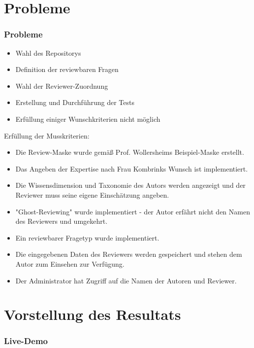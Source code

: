 \documentclass{beamer}
\begin{document}
	\section{Probleme}
		\begin{frame}
			\frametitle{Probleme}
    		\begin{itemize}
    			\item Wahl des Repositorys
		    	\item Definition der reviewbaren Fragen
    			\item Wahl der Reviewer-Zuordnung
    			\item Erstellung und Durchführung der Tests
    			\item Erfüllung einiger Wunschkriterien nicht möglich
    		\end{itemize}
		\end{frame}
		\begin{frame}
			Erfüllung der Musskriterien:
			\begin{itemize}
				\item Die Review-Maske wurde gemäß Prof. Wollersheims Beispiel-Maske erstellt.
				\item Das Angeben der Expertise nach Frau Kombrinks Wunsch ist implementiert.
				\item Die Wissensdimension und Taxonomie des Autors werden angezeigt und der Reviewer muss seine eigene Einschätzung angeben.
				\item "Ghost-Reviewing" wurde implementiert - der Autor erfährt nicht den Namen des Reviewers und umgekehrt.
				\item Ein reviewbarer Fragetyp wurde implementiert.	
				\item Die eingegebenen Daten des Reviewers werden gespeichert und stehen dem Autor zum Einsehen zur Verfügung.
				\item Der Administrator hat Zugriff auf die Namen der Autoren und Reviewer.
			\end{itemize}
		\end{frame}

	\section{Vorstellung des Resultats}
		\begin{frame}
		\frametitle{Live-Demo}
		\end{frame}
\end{document}
